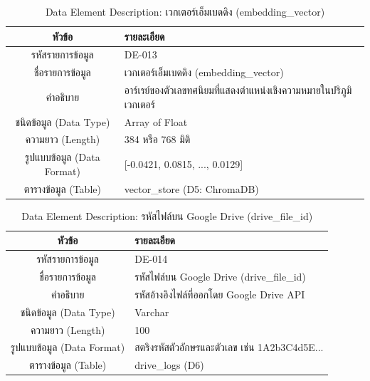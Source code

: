 \begin{table}[htbp]
\centering
\caption{Data Element Description: เวกเตอร์เอ็มเบดดิง (embedding\_vector)}
\label{tab3:de_vector}
\begin{tabularx}{\textwidth}{| c | L |}
\hline
\textbf{หัวข้อ} & \textbf{รายละเอียด} \\ \hline
รหัสรายการข้อมูล & DE-013 \\ \hline
ชื่อรายการข้อมูล & เวกเตอร์เอ็มเบดดิง (embedding\_vector) \\ \hline
คำอธิบาย & อาร์เรย์ของตัวเลขทศนิยมที่แสดงตำแหน่งเชิงความหมายในปริภูมิเวกเตอร์ \\ \hline
ชนิดข้อมูล (Data Type) & Array of Float \\ \hline
ความยาว (Length) & 384 หรือ 768 มิติ \\ \hline
รูปแบบข้อมูล (Data Format) & [-0.0421, 0.0815, ..., 0.0129] \\ \hline
ตารางข้อมูล (Table) & vector\_store (D5: ChromaDB) \\ \hline
\end{tabularx}
\end{table}

\begin{table}[htbp]
\centering
\caption{Data Element Description: รหัสไฟล์บน Google Drive (drive\_file\_id)}
\label{tab3:de_drive_id}
\begin{tabularx}{\textwidth}{| c | L |}
\hline
\textbf{หัวข้อ} & \textbf{รายละเอียด} \\ \hline
รหัสรายการข้อมูล & DE-014 \\ \hline
ชื่อรายการข้อมูล & รหัสไฟล์บน Google Drive (drive\_file\_id) \\ \hline
คำอธิบาย & รหัสอ้างอิงไฟล์ที่ออกโดย Google Drive API \\ \hline
ชนิดข้อมูล (Data Type) & Varchar \\ \hline
ความยาว (Length) & 100 \\ \hline
รูปแบบข้อมูล (Data Format) & สตริงรหัสตัวอักษรและตัวเลข เช่น 1A2b3C4d5E... \\ \hline
ตารางข้อมูล (Table) & drive\_logs (D6) \\ \hline
\end{tabularx}
\end{table}

